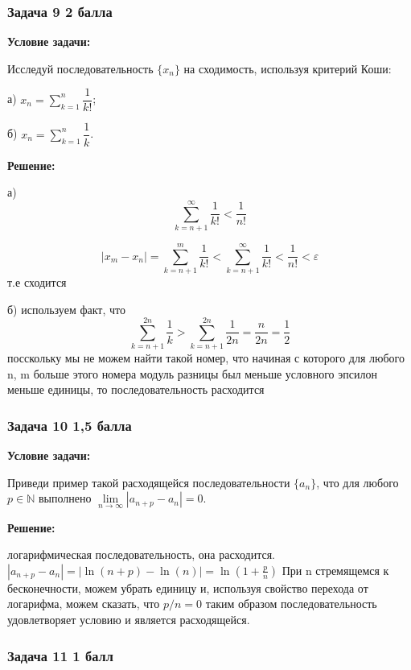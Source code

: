 \documentclass[a4paper,12pt]{article}
\begin{document}
\subsubsection{Задача 9 \hfill 2 балла}

\textbf{Условие задачи:}

Исследуй последовательность \( \{ x_n \} \) на сходимость, используя критерий Коши:

а) \( x_n = \sum\limits_{k=1}^{n} \dfrac{1}{k!} \);

б) \( x_n = \sum\limits_{k=1}^{n} \dfrac{1}{k} \).

\textbf{Решение: }

а)
\[
\sum\limits_{k=n+1}^{\infty} \frac{1}{k!} < \frac{1}{n!} 
\]

\[
|x_m - x_n| = \sum\limits_{k=n+1}^{m} \dfrac{1}{k!} < \sum\limits_{k=n+1}^{\infty} \dfrac{1}{k!} < \dfrac{1}{n!} < \varepsilon
\]
т.е сходится

б)
используем факт, что
\[
\sum\limits_{k=n+1}^{2n} \dfrac{1}{k} > \sum\limits_{k=n+1}^{2n} \dfrac{1}{2n} = \dfrac{n}{2n} = \dfrac{1}{2}
\]
посскольку мы не можем найти такой номер, что начиная с которого для любого n, m больше этого номера модуль разницы был меньше условного эпсилон меньше единицы, то последовательность расходится

\vspace{1cm}

\subsubsection{Задача 10 \hfill 1,5 балла}

\textbf{Условие задачи:}

Приведи пример такой расходящейся последовательности \( \{ a_n \} \), что для любого \( p \in \mathbb{N} \) выполнено \( \lim\limits_{n \to \infty} |a_{n+p} - a_n| = 0 \).

\textbf{Решение: }

логарифмическая последовательность, она расходится. $   |a_{n+p} - a_n| = |\ln(n+p) - \ln(n)| = \ln\left(1 + \frac{p}{n}\right)$ При n стремящемся к бесконечности, можем убрать единицу и, используя свойство перехода от логарифма, можем сказать, что $p/n=0$ таким образом последовательность удовлетворяет условию и является расходящейся.

\vspace{1cm}

\subsubsection{Задача 11 \hfill 1 балл}
\end{document}
